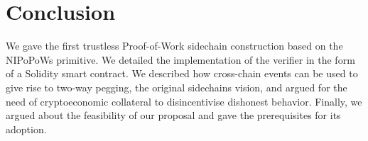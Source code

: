 \section{Conclusion}
We gave the first trustless Proof-of-Work sidechain construction based on
the NIPoPoWs primitive. We detailed the implementation of the verifier in the
form of a Solidity smart contract. We described how cross-chain events can
be used to give rise to two-way pegging, the original sidechains vision, and
argued for the need of cryptoeconomic collateral to disincentivise dishonest
behavior. Finally, we argued about the feasibility of our proposal and gave the
prerequisites for its adoption.
